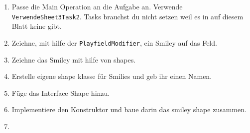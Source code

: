 \begin{enumerate}
    \item Passe die Main Operation an die Aufgabe an. Verwende \lstinline{VerwendeSheet3Task2}. Tasks brauchst du nicht setzen weil es in auf diesem Blatt keine gibt.
    \item Zeichne, mit hilfe der \lstinline{PlayfieldModifier}, ein Smiley auf das Feld. %
    \item Zeichne das Smiley mit hilfe von shapes.
    \item Erstelle eigene shape klasse für Smilies und geb ihr einen Namen.
    \begin{Infobox}

    \end{Infobox}
    \item Füge das Interface Shape hinzu.
    \begin{Infobox}[Interface]

    \end{Infobox}    
    \item Implementiere den Konstruktor und baue darin das smiley shape zusammen.
    \item 
\end{enumerate}

\newpage
